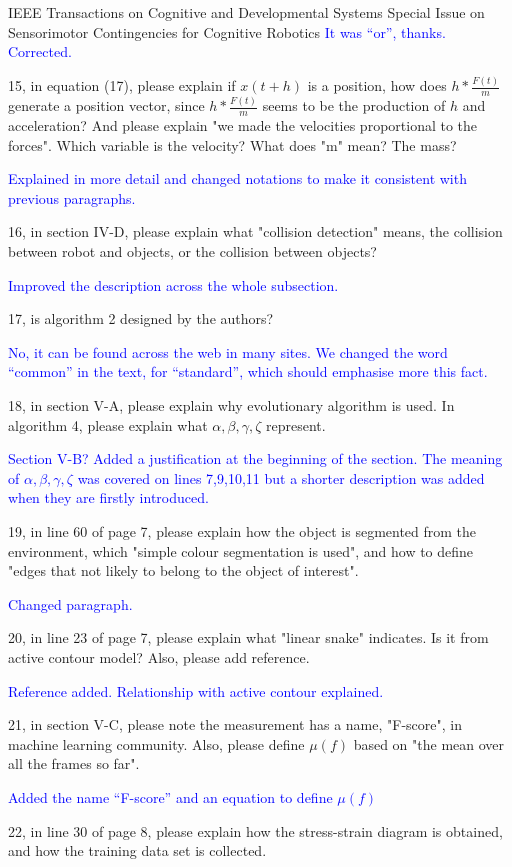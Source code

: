 \documentclass[a4paper,12pt]{letter}
\newcommand{\comment}[1]{\textcolor{blue}{#1}}
\begin{document}
\begin{letter}{IEEE Transactions on Cognitive and Developmental Systems\newline
Special Issue on Sensorimotor Contingencies for Cognitive Robotics}
\comment{It was ``or'', thanks.  Corrected.}

15, in equation (17), please explain if $x(t+h)$ is a position, how does $h*\frac{F(t)}{m}$ generate a position vector, since $h*\frac{F(t)}{m}$ seems to be the production of $h$ and acceleration? And please explain "we made the velocities proportional to the forces". Which variable is the velocity? What does "m" mean? The mass?

\comment{Explained in more detail and changed notations to make it consistent with previous paragraphs.}

16, in section IV-D, please explain what "collision detection" means, the collision between robot and objects, or the collision between objects?

\comment{Improved the description across the whole subsection.}

17, is algorithm 2 designed by the authors?

\comment{No, it can be found across the web in many sites.  We changed the word ``common'' in the text, for ``standard'', which should emphasise more this fact.}

18, in section V-A, please explain why evolutionary algorithm is used. In algorithm 4, please explain what $\alpha, \beta, \gamma, \zeta$ represent.

\comment{Section V-B? Added a justification at the beginning of the section.  The meaning of $\alpha, \beta, \gamma, \zeta$ was covered on lines 7,9,10,11 but a shorter description was added when they are firstly introduced.}

19, in line 60 of page 7, please explain how the object is segmented from the environment, which "simple colour segmentation is used", and how to define "edges that not likely to belong to the object of interest".

\comment{Changed paragraph.}

20, in line 23 of page 7, please explain what "linear snake" indicates. Is it from active contour model? Also, please add reference. 

\comment{Reference added.  Relationship with active contour explained.}

21, in section V-C, please note the measurement has a name, "F-score", in machine learning community. Also, please define $\mu(f)$ based on "the mean over all the frames so far".

\comment{Added the name ``F-score'' and an equation to define $\mu(f)$}

22, in line 30 of page 8, please explain how the stress-strain diagram is obtained, and how the training data set is collected. 


\end{letter}
\end{document}
